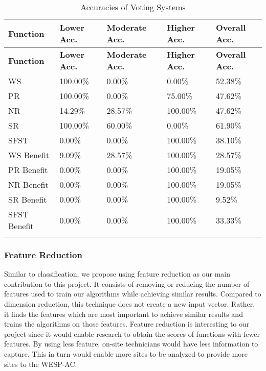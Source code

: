 \documentclass[12pt,letterpaper]{article}
\begin{document}
\begin{longtable}{|p{3cm}|p{2.5cm}|p{2.5cm}|p{2.5cm}|p{2.5cm}|}
\hline
\textbf{Function} & \textbf{Lower Acc.} & \textbf{Moderate Acc.} & \textbf{Higher Acc.} & \textbf{Overall Acc.} \\ \hline
\endfirsthead
\hline
\textbf{Function} & \textbf{Lower Acc.} & \textbf{Moderate Acc.} & \textbf{Higher Acc.} & \textbf{Overall Acc.} \\ \hline
\endhead

WS & 100.00\% & 0.00\% & 0.00\% & 52.38\% \\ \hline
PR & 100.00\% & 0.00\% & 75.00\% & 47.62\% \\ \hline
NR & 14.29\% & 28.57\% & 100.00\% & 47.62\% \\ \hline
SR & 100.00\% & 60.00\% & 0.00\% & 61.90\% \\ \hline
SFST & 0.00\% & 0.00\% & 100.00\% & 38.10\% \\ \hline

WS Benefit & 9.09\% & 28.57\% & 100.00\% & 28.57\% \\ \hline
PR Benefit & 0.00\% & 0.00\% & 100.00\% & 19.05\% \\ \hline
NR Benefit & 0.00\% & 0.00\% & 100.00\% & 19.05\% \\ \hline
SR Benefit & 0.00\% & 0.00\% & 100.00\% & 9.52\% \\ \hline
SFST Benefit & 0.00\% & 0.00\% & 100.00\% & 33.33\% \\ \hline

\caption{Accuracies of Voting Systems}
\label{tab:grouping_3_reg_spec}
\end{longtable}





\subsubsection{Feature Reduction}
Similar to classification, we propose using feature reduction as our main contribution to this project.
It consists of removing or reducing the number of features used to train our algorithms while achieving similar results.
Compared to dimension reduction, this technique does not create a new input vector.
Rather, it finds the features which are most important to achieve similar results and trains the algorithms on those features.
Feature reduction is interesting to our project since it would enable research to obtain the scores of functions with fewer features.
By using less feature, on-site technicians would have less information to capture.
This in turn would enable more sites to be analyzed to provide more sites to the WESP-AC.
\end{document}
